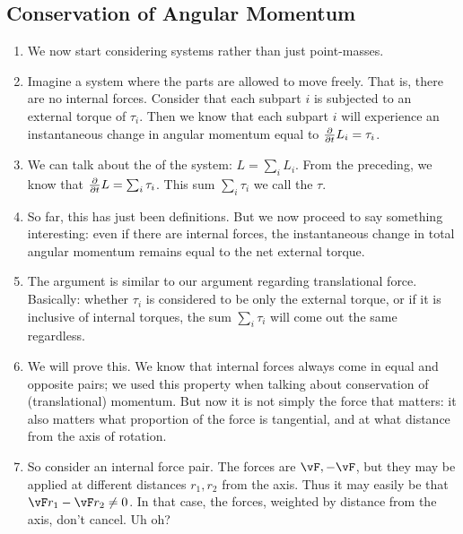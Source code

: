 \subsection{Conservation of Angular Momentum}

\begin{enumerate}
  \item We now start considering systems rather than just point-masses.

  \item Imagine a system where the parts are allowed to move freely.
  That is, there are no internal forces. Consider that each subpart $i$
  is subjected to an external torque of $\tau_i$. Then we know that each
  subpart $i$ will experience an instantaneous change in angular
  momentum equal to $\frac{\partial }{\partial t} L_i = \tau_i$.

  \item We can talk about the  of the
  system: $L = \sum_i L_i$. From the preceding, we know that
  $\frac{\partial }{\partial t} L = \sum_i \tau_i$. This sum $\sum_i \tau_i$ we call the
   $\tau$.

  \item So far, this has just been definitions. But we now proceed to
  say something interesting: even if there are internal forces, the
  instantaneous change in total angular momentum remains equal to the
  net external torque.

  \item The argument is similar to our argument regarding translational
  force. Basically: whether $\tau_i$ is considered to be only the
  external torque, or if it is inclusive of internal torques, the sum
  $\sum_i \tau_i$ will come out the same regardless.

  \item We will prove this. We know that internal forces always come in
  equal and opposite pairs; we used this property when talking about
  conservation of (translational) momentum. But now it is not simply the
  force that matters: it also matters what proportion of the force is
  tangential, and at what distance from the axis of rotation.

  \item So consider an internal force pair. The forces are $\vF, -\vF$,
  but they may be applied at different distances $r_1, r_2$ from the
  axis. Thus it may easily be that $\vF r_1 - \vF r_2 \ne 0$. In that
  case, the forces, weighted by distance from the axis, don't cancel. Uh
  oh?


\end{enumerate}
